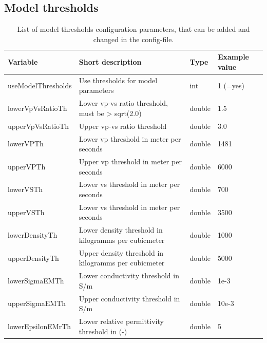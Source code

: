 \documentclass[pdftex,a4paper,parskip,listof=totoc,bibliography=totoc,onehalfspacing,12pt]{scrreprt}
\begin{document}
\subsection{Model thresholds}
\label{config:precond}
\begin{table}[h!]
\caption[List of model thresholds configuration parameters.]{List of model thresholds configuration parameters, that can be added and changed in the config-file.}\label{tab:config_thresholds}
\centering
\begin{adjustbox}{width=1\textwidth,center=\textwidth}
	\begin{tabular}{llll}
	\toprule
         Variable                 & Short description                                                   & Type   & Example value \\
	\midrule
         useModelThresholds     & Use thresholds for model parameters                                 &  int   & 1 (=yes) \\
         lowerVpVsRatioTh                & Lower vp-vs ratio threshold, must be > sqrt(2.0)              & double & 1.5 \\
         upperVpVsRatioTh                & Upper vp-vs ratio threshold                        & double & 3.0 \\
         lowerVPTh                & Lower vp threshold in meter per seconds                             & double & 1481 \\
         upperVPTh                & Upper vp threshold in meter per seconds                             & double & 6000 \\
         lowerVSTh                & Lower vs threshold in meter per seconds                             & double & 700 \\
         upperVSTh                & Lower vs threshold in meter per seconds                             & double & 3500 \\
         lowerDensityTh           & Lower density threshold in kilogramms per cubicmeter                 & double & 1000 \\
         upperDensityTh           & Upper density threshold in kilogramms per cubicmeter                 & double & 5000 \\
         lowerSigmaEMTh           & Lower conductivity threshold in S/m                 & double & 1e-3 \\
         upperSigmaEMTh           & Upper conductivity threshold in S/m                 & double & 10e-3 \\
         lowerEpsilonEMrTh           & Lower relative permittivity threshold in (-)                & double & 5 \\

\end{tabular}
\end{adjustbox}
\end{table}
\end{document}
